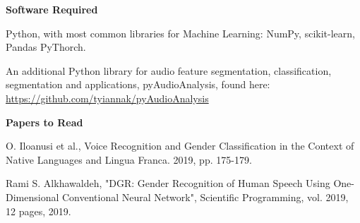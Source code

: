 \documentclass{article}
\begin{document}
\vspace{2mm}
\textbf{Software Required}\par
Python, with most common libraries for Machine Learning: NumPy, scikit-learn, Pandas PyThorch. \par
An additional Python library for audio feature segmentation, classification, segmentation and applications, pyAudioAnalysis, found here: \url{https://github.com/tyiannak/pyAudioAnalysis} \par

\vspace{2mm}
\textbf{Papers to Read}\par
[1]	O. Iloanusi et al., Voice Recognition and Gender Classification in the Context of Native Languages and Lingua Franca. 2019, pp. 175-179.\par
[2] Rami S. Alkhawaldeh, "DGR: Gender Recognition of Human Speech Using One-Dimensional Conventional Neural Network", Scientific Programming, vol. 2019, 12 pages, 2019.
\end{document}
